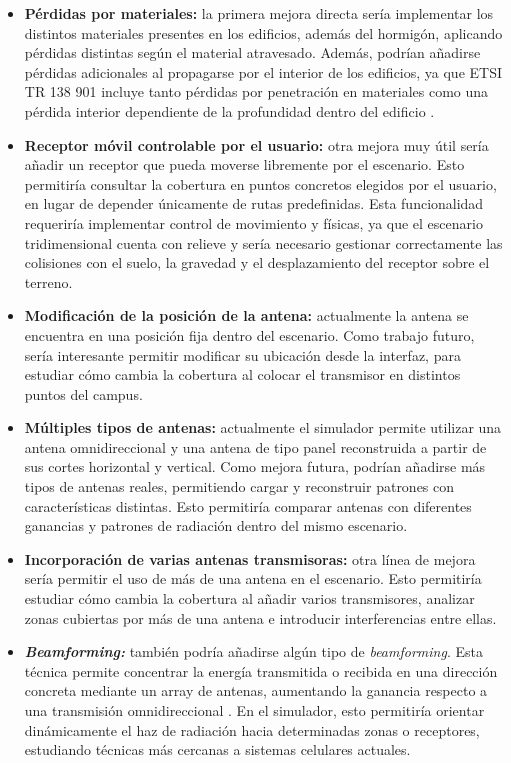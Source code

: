 \begin{itemize}
    \item \textbf{Pérdidas por materiales:} la primera mejora directa sería implementar los distintos materiales presentes en los edificios, además del hormigón, aplicando pérdidas distintas según el material atravesado. Además, podrían añadirse pérdidas adicionales al propagarse por el interior de los edificios, ya que ETSI TR 138 901 incluye tanto pérdidas por penetración en materiales como una pérdida interior dependiente de la profundidad dentro del edificio \cite{etsi138901}.

    \item \textbf{Receptor móvil controlable por el usuario:} otra mejora muy útil sería añadir un receptor que pueda moverse libremente por el escenario. Esto permitiría consultar la cobertura en puntos concretos elegidos por el usuario, en lugar de depender únicamente de rutas predefinidas. Esta funcionalidad requeriría implementar control de movimiento y físicas, ya que el escenario tridimensional cuenta con relieve y sería necesario gestionar correctamente las colisiones con el suelo, la gravedad y el desplazamiento del receptor sobre el terreno.

    \item \textbf{Modificación de la posición de la antena:} actualmente la antena se encuentra en una posición fija dentro del escenario. Como trabajo futuro, sería interesante permitir modificar su ubicación desde la interfaz, para estudiar cómo cambia la cobertura al colocar el transmisor en distintos puntos del campus.

    \item \textbf{Múltiples tipos de antenas:} actualmente el simulador permite utilizar una antena omnidireccional y una antena de tipo panel reconstruida a partir de sus cortes horizontal y vertical. Como mejora futura, podrían añadirse más tipos de antenas reales, permitiendo cargar y reconstruir patrones con características distintas. Esto permitiría comparar antenas con diferentes ganancias y patrones de radiación dentro del mismo escenario.

    \item \textbf{Incorporación de varias antenas transmisoras:} otra línea de mejora sería permitir el uso de más de una antena en el escenario. Esto permitiría estudiar cómo cambia la cobertura al añadir varios transmisores, analizar zonas cubiertas por más de una antena e introducir interferencias entre ellas.

    \item \textbf{\textit{Beamforming:}} también podría añadirse algún tipo de \textit{beamforming}. Esta técnica permite concentrar la energía transmitida o recibida en una dirección concreta mediante un array de antenas, aumentando la ganancia respecto a una transmisión omnidireccional \cite{7342886}. En el simulador, esto permitiría orientar dinámicamente el haz de radiación hacia determinadas zonas o receptores, estudiando técnicas más cercanas a sistemas celulares actuales.


\end{itemize}
